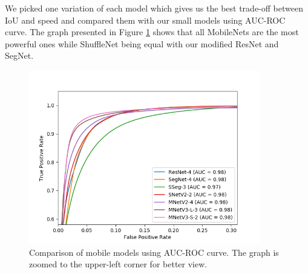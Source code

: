 We picked one variation of each model which gives us the best trade-off between IoU and speed
and compared them with our small models using AUC-ROC curve. The graph presented in Figure
\ref{img:mobilemodels_roc} shows that all MobileNets are the most powerful ones while
ShuffleNet being equal with our modified ResNet and SegNet. 

\begin{figure}[!h]
	\centerline{\includegraphics[width=0.9\textwidth]{images/mobilemodels_roc.png}}
	\caption[Comparison of mobile models using AUC-ROC curve]{Comparison of mobile models using AUC-ROC curve. The graph is zoomed to the upper-left corner for better view.}
	\label{img:mobilemodels_roc}
\end{figure}